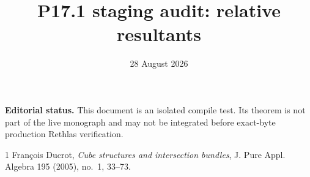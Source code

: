 \documentclass[11pt]{article}
\title{P17.1 staging audit: relative resultants}
\author{}
\date{28 August 2026}
\begin{document}
\maketitle

\noindent
\textbf{Editorial status.}
This document is an isolated compile test.  Its theorem is not part of the
live monograph and may not be integrated before exact-byte production Rethlas
verification.




\begin{thebibliography}{1}
François Ducrot,
\emph{Cube structures and intersection bundles},
J. Pure Appl. Algebra 195 (2005), no.~1, 33--73.
\end{thebibliography}
\end{document}

